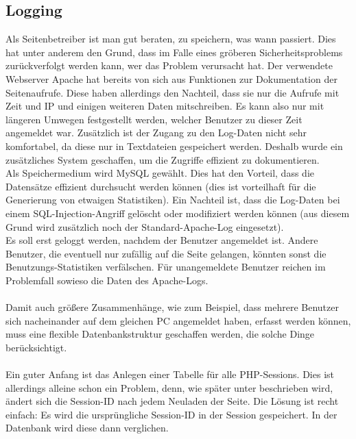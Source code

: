 \newpage
\subsection{Logging}

Als Seitenbetreiber ist man gut beraten, zu speichern, was wann passiert. Dies hat unter anderem den Grund, dass im Falle eines gröberen Sicherheitsproblems zurückverfolgt werden kann, wer das Problem verursacht hat. Der verwendete Webserver Apache hat bereits von sich aus Funktionen zur Dokumentation der Seitenaufrufe. Diese haben allerdings den Nachteil, dass sie nur die Aufrufe mit Zeit und IP und einigen weiteren Daten mitschreiben. Es kann also nur mit längeren Umwegen festgestellt werden, welcher Benutzer zu dieser Zeit angemeldet war. Zusätzlich ist der Zugang zu den Log-Daten nicht sehr komfortabel, da diese nur in Textdateien gespeichert werden. Deshalb wurde ein zusätzliches System geschaffen, um die Zugriffe effizient zu dokumentieren.\\
Als Speichermedium wird MySQL gewählt. Dies hat den Vorteil, dass die Datensätze effizient durchsucht werden können (dies ist vorteilhaft für die Generierung von etwaigen Statistiken). Ein Nachteil ist, dass die Log-Daten bei einem SQL-Injection-Angriff gelöscht oder modifiziert werden können (aus diesem Grund wird zusätzlich noch der Standard-Apache-Log eingesetzt).\\
Es soll erst geloggt werden, nachdem der Benutzer angemeldet ist. Andere Benutzer, die eventuell nur zufällig auf die Seite gelangen, könnten sonst die Benutzungs-Statistiken verfälschen. Für unangemeldete Benutzer reichen im Problemfall sowieso die Daten des Apache-Logs.\\
\\
Damit auch größere Zusammenhänge, wie zum Beispiel, dass mehrere Benutzer sich nacheinander auf dem gleichen PC angemeldet haben, erfasst werden können, muss eine flexible Datenbankstruktur geschaffen werden, die solche Dinge berücksichtigt.\\
\\
Ein guter Anfang ist das Anlegen einer Tabelle für alle PHP-Sessions. Dies ist allerdings alleine schon ein Problem, denn, wie später unter  beschrieben wird, ändert sich die Session-ID nach jedem Neuladen der Seite. Die Lösung ist recht einfach: Es wird die ursprüngliche Session-ID in der Session gespeichert. In der Datenbank wird diese dann verglichen.\\
